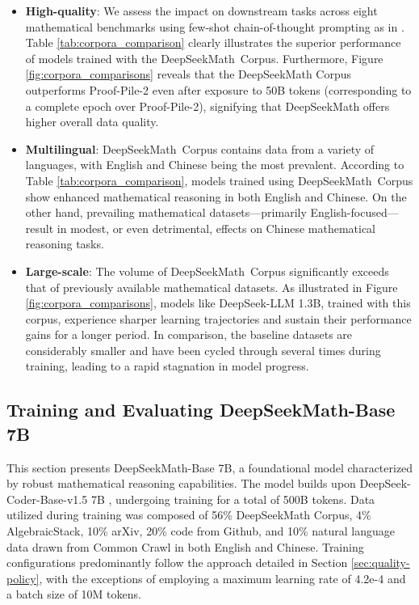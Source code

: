 \begin{itemize}[topsep=0pt]
\begin{itemize}[topsep=0pt]
    \item \textbf{High-quality}:
    We assess the impact on downstream tasks across eight mathematical benchmarks using few-shot chain-of-thought prompting as in \cite{cot}. Table \ref{tab:corpora_comparison} clearly illustrates the superior performance of models trained with the DeepSeekMath~Corpus. Furthermore, Figure \ref{fig:corpora_comparisons} reveals that the DeepSeekMath Corpus outperforms Proof-Pile-2 even after exposure to 50B tokens (corresponding to a complete epoch over Proof-Pile-2), signifying that DeepSeekMath offers higher overall data quality.
    \item \textbf{Multilingual}:
    DeepSeekMath~Corpus contains data from a variety of languages, with English and Chinese being the most prevalent. According to Table \ref{tab:corpora_comparison}, models trained using DeepSeekMath~Corpus show enhanced mathematical reasoning in both English and Chinese. On the other hand, prevailing mathematical datasets—primarily English-focused—result in modest, or even detrimental, effects on Chinese mathematical reasoning tasks.
    \item \textbf{Large-scale}:
    The volume of DeepSeekMath~Corpus significantly exceeds that of previously available mathematical datasets. As illustrated in Figure \ref{fig:corpora_comparisons}, models like DeepSeek-LLM 1.3B, trained with this corpus, experience sharper learning trajectories and sustain their performance gains for a longer period. In comparison, the baseline datasets are considerably smaller and have been cycled through several times during training, leading to a rapid stagnation in model progress.
\end{itemize}

\subsection{Training and Evaluating DeepSeekMath-Base 7B}

This section presents DeepSeekMath-Base 7B, a foundational model characterized by robust mathematical reasoning capabilities. The model builds upon DeepSeek-Coder-Base-v1.5 7B \citep{deepseek-coder}, undergoing training for a total of 500B tokens. Data utilized during training was composed of 56\% DeepSeekMath Corpus, 4\% AlgebraicStack, 10\% arXiv, 20\% code from Github, and 10\% natural language data drawn from Common Crawl in both English and Chinese. Training configurations predominantly follow the approach detailed in Section \ref{sec:quality-policy}, with the exceptions of employing a maximum learning rate of 4.2e-4 and a batch size of 10M tokens.


\end{itemize}
